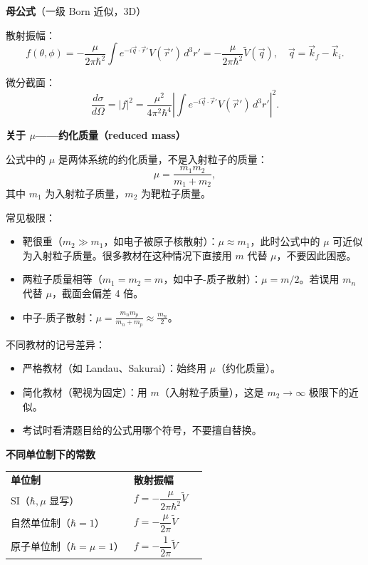 \begin{cheatbox}

\textbf{母公式}（一级 Born 近似，3D）

散射振幅：
\[
f(\theta,\phi) = -\frac{\mu}{2\pi\hbar^2} \int e^{-i\vec{q}\cdot\vec{r}'} V(\vec{r}') \, d^3r' = -\frac{\mu}{2\pi\hbar^2} \tilde{V}(\vec{q}), \quad \vec{q} = \vec{k}_f - \vec{k}_i.
\]

微分截面：
\[
\frac{d\sigma}{d\Omega} = |f|^2 = \frac{\mu^2}{4\pi^2\hbar^4} \left| \int e^{-i\vec{q}\cdot\vec{r}'} V(\vec{r}') \, d^3r' \right|^2.
\]

\textbf{关于 $\mu$——约化质量（reduced mass）}

公式中的 $\mu$ 是两体系统的约化质量，不是入射粒子的质量：
\[
\mu = \frac{m_1 m_2}{m_1 + m_2},
\]
其中 $m_1$ 为入射粒子质量，$m_2$ 为靶粒子质量。

常见极限：
\begin{itemize}
    \item 靶很重（$m_2 \gg m_1$，如电子被原子核散射）：$\mu \approx m_1$，此时公式中的 $\mu$ 可近似为入射粒子质量。很多教材在这种情况下直接用 $m$ 代替 $\mu$，不要因此困惑。
    \item 两粒子质量相等（$m_1 = m_2 = m$，如中子-质子散射）：$\mu = m/2$。若误用 $m_n$ 代替 $\mu$，截面会偏差 4 倍。
    \item 中子-质子散射：$\mu = \frac{m_n m_p}{m_n + m_p} \approx \frac{m_n}{2}$。
\end{itemize}

不同教材的记号差异：
\begin{itemize}
    \item 严格教材（如 Landau、Sakurai）：始终用 $\mu$（约化质量）。
    \item 简化教材（靶视为固定）：用 $m$（入射粒子质量），这是 $m_2 \to \infty$ 极限下的近似。
    \item 考试时看清题目给的公式用哪个符号，不要擅自替换。
\end{itemize}

\textbf{不同单位制下的常数}

\begin{tabular}{lll}
\textbf{单位制} & \textbf{散射振幅} & \\
SI（$\hbar, \mu$ 显写） & $f = -\dfrac{\mu}{2\pi\hbar^2} \tilde{V}$ & \\
自然单位制（$\hbar = 1$） & $f = -\dfrac{\mu}{2\pi} \tilde{V}$ & \\
原子单位制（$\hbar = \mu = 1$） & $f = -\dfrac{1}{2\pi} \tilde{V}$ & \\
\end{tabular}


\end{cheatbox}
